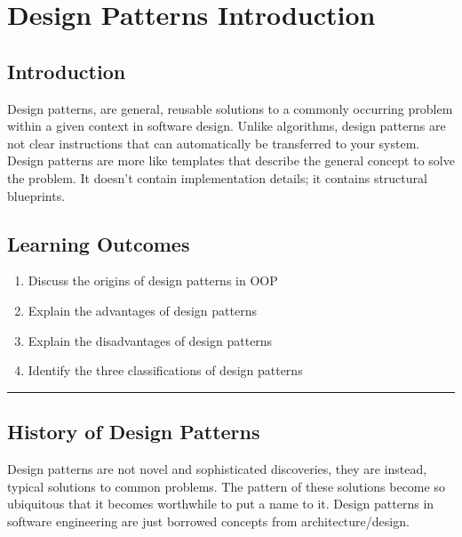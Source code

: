 \chapter{Design Patterns
Introduction}\label{design-patterns-introduction.md__design-patterns-introduction}

\section{Introduction}\label{design-patterns-introduction.md__introduction}

Design patterns, are general, reusable solutions to a commonly occurring
problem within a given context in software design. Unlike algorithms,
design patterns are not clear instructions that can automatically be
transferred to your system. Design patterns are more like templates that
describe the general concept to solve the problem. It doesn't contain
implementation details; it contains structural blueprints.

\section{Learning
Outcomes}\label{design-patterns-introduction.md__learning-outcomes}

\begin{enumerate}
\def\labelenumi{\arabic{enumi}.}
\tightlist
\item
  Discuss the origins of design patterns in OOP
\item
  Explain the advantages of design patterns
\item
  Explain the disadvantages of design patterns
\item
  Identify the three classifications of design patterns
\end{enumerate}

\begin{center}\rule{0.5\linewidth}{0.5pt}\end{center}

\section{History of Design
Patterns}\label{design-patterns-introduction.md__history-of-design-patterns}

Design patterns are not novel and sophisticated discoveries, they are
instead, typical solutions to common problems. The pattern of these
solutions become so ubiquitous that it becomes worthwhile to put a name
to it. Design patterns in software engineering are just borrowed
concepts from architecture/design.

